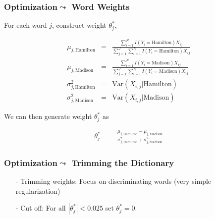 \documentclass{beamer}
\numberwithin{equation}{section}
\begin{document}
\begin{frame}
\frametitle{Optimization$\leadsto$ Word Weights}

For each word $j$, construct weight $\theta^{*}_{j}$,
\begin{small}
\begin{eqnarray}
\mu_{j, \text{Hamilton}} & = & \frac{\sum_{i = 1}^{N} I(Y_{i} = \text{Hamilton}) X_{ij} }{\sum_{j=1}^{J} \sum_{i = 1}^{N} I(Y_{i} = \text{Hamilton}) X_{ij} } \nonumber \\
\mu_{j, \text{Madison}} & = & \frac{\sum_{i = 1}^{N} I(Y_{i} = \text{Madison}) X_{ij} }{\sum_{j=1}^{J} \sum_{i = 1}^{N} I(Y_{i} = \text{Madison}) X_{ij} } \nonumber \\
\sigma^{2}_{j, \text{Hamilton}} & = & \text{Var}(X_{i,j} |  \text{Hamilton}) \nonumber \\
\sigma^{2}_{j, \text{Madison} }& = & \text{Var}(X_{i,j} | \text{Madison}) \nonumber
\end{eqnarray}
\end{small}


We can then generate weight $\theta^{*}_{j}$ as

\begin{eqnarray}
\theta^{*}_j &= & \frac{\mu_{j, \text{Hamilton}}  - \mu_{j, \text{Madison}}  } {\sigma_{j, \text{Hamilton}}^{2} + \sigma_{j, \text{Madison}}^{2}    }  \nonumber
\end{eqnarray}




\end{frame}




\begin{frame}
\frametitle{Optimization$\leadsto$ Trimming the Dictionary}


\begin{itemize}
\item[-] Trimming weights: Focus on discriminating words (very simple \alert{regularization})
\item[-] Cut off: For all $|\theta^{*}_{j}|<0.025$ set $\theta^{*}_{j} = 0$.
\end{itemize}



\end{frame}
\end{document}

